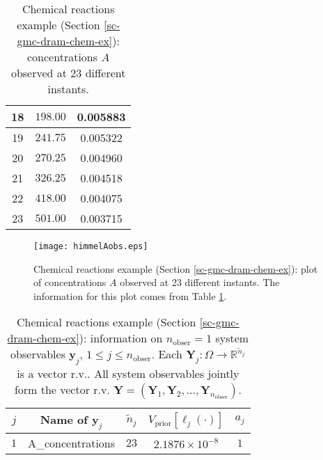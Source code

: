 \begin{table}[h!]
\begin{center}
\begin{tabular}{|c|c|c|}
\hline
18  & $198.00$             & 0.005883 \\
\hline
19  & $241.75$             & 0.005322 \\
\hline
20  & $270.25$             & 0.004960 \\
\hline
21  & $326.25$             & 0.004518 \\
\hline
22  & $418.00$             & 0.004075 \\
\hline
23  & $501.00$             & 0.003715 \\
\hline
\end{tabular}
\caption{Chemical reactions example (Section \ref{sc-gmc-dram-chem-ex}):
concentrations $A$ observed at 23 different instants.
}
\label{tab-dram-chem-ex-sys-y1-obs}
\end{center}
\end{table}

\begin{figure}[h!]
\begin{center}
\texttt{[image: himmelAobs.eps]}
\end{center}
\caption{Chemical reactions example (Section \ref{sc-gmc-dram-chem-ex}):
plot of concentrations $A$ observed at 23 different instants.
The information for this plot comes from Table \ref{tab-dram-chem-ex-sys-y1-obs}.
}
\label{fig-dram-chem-ex-sys-y1-obs}
\end{figure}

\begin{table}[h!]
\begin{center}
\begin{tabular}{|c|c|c|c|c|}
\hline
 $j$      & Name of $\mathbf{y}_j$ & ${\tilde{n}_j}$ & $V_{\text{prior}}[\ell_j(\cdot)]$ & $a_j$ \\
\hline
\hline
 $1$      & A\_concentrations      & $23$            & $2.1876\times 10^{-8}$            & $1$   \\
\hline
\end{tabular}
\caption{Chemical reactions example (Section \ref{sc-gmc-dram-chem-ex}):
information on $n_{\text{obser}}=1$ system observables $\mathbf{y}_j$, $1\leqslant j\leqslant n_{\text{obser}}$.
Each $\mathbf{Y}_j:\Omega\rightarrow\mathbb{R}^{{\tilde{n}}_j}$ is a vector r.v..
All system observables jointly form the vector r.v. $\mathbf{Y}=(\mathbf{Y}_1,\mathbf{Y}_2,\ldots,\mathbf{Y}_{n_{\text{obser}}})$.
}
\label{tab-dram-chem-ex-obser}
\end{center}
\end{table}

